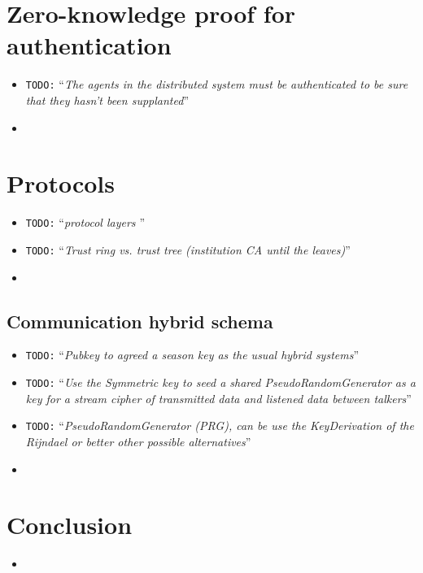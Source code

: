 \documentclass[10pt,a4paper,twoside]{llncs}
\newcommand{\todo}[1]{\texttt{\color{red}TODO:} ``\emph{#1}''}
\begin{document}
%
\section{Zero-knowledge proof for authentication \label{sec:auth}}
\begin{itemize}
 \item \todo{The agents in the distributed system must be authenticated to be sure that they hasn't been supplanted}
 \item 
\end{itemize}

%
\section{Protocols}

\begin{itemize}
 \item \todo{protocol layers \cite{Schneier:1995:ACP:572932}}
 \item \todo{Trust ring vs. trust tree (institution CA until the leaves)}
 \item 
\end{itemize}

%
\subsection{Communication hybrid schema \label{sec:intercom}}

\begin{itemize}
 \item \todo{Pubkey to agreed a season key as the usual hybrid systems}
 \item \todo{Use the Symmetric key to seed a shared PseudoRandomGenerator as a key for a stream cipher of transmitted data and listened data between talkers}
 \item \todo{\emph{PseudoRandomGenerator} (PRG), can be use the KeyDerivation of the Rijndael or better other possible alternatives}
 \item 
\end{itemize}

%
\section{Conclusion \label{sec:conclusions}}

\begin{itemize}
 \item 
\end{itemize}



\end{document}
